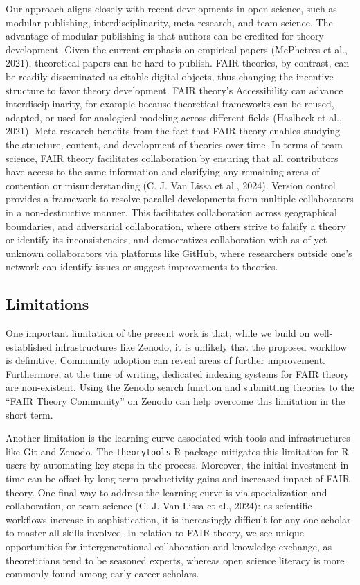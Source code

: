 \documentclass[man]{apa7}
\begin{document}
Our approach aligns closely with recent developments in open science,
such as modular publishing, interdisciplinarity, meta-research, and team science.
The advantage of modular publishing is that authors can be credited for theory development.
Given the current emphasis on empirical papers (McPhetres et al., 2021), theoretical papers can be hard to publish.
FAIR theories, by contrast, can be readily disseminated as citable digital objects, thus changing the incentive structure to favor theory development.
FAIR theory's Accessibility can advance interdisciplinarity,
for example because theoretical frameworks can be reused, adapted, or used for analogical modeling across different fields (Haslbeck et al., 2021).
Meta-research benefits from the fact that FAIR theory enables studying the structure, content, and development of theories over time.
In terms of team science, FAIR theory facilitates collaboration by ensuring that all contributors have access to the same information and
clarifying any remaining areas of contention or misunderstanding (C. J. Van Lissa et al., 2024).
Version control provides a framework to resolve parallel developments from multiple collaborators in a non-destructive manner.
This facilitates collaboration across geographical boundaries,
and adversarial collaboration, where others strive to falsify a theory or identify its inconsistencies, and democratizes collaboration with as-of-yet unknown collaborators via platforms like GitHub, where researchers outside one's network can identify issues or suggest improvements to theories.

\subsection{Limitations}\label{limitations}

One important limitation of the present work is that,
while we build on well-established infrastructures like Zenodo,
it is unlikely that the proposed workflow is definitive.
Community adoption can reveal areas of further improvement.
Furthermore, at the time of writing, dedicated indexing systems for FAIR theory are non-existent.
Using the Zenodo search function and submitting theories to the ``FAIR Theory Community'' on Zenodo can help overcome this limitation in the short term.

\label{learningcurve}{Another limitation is the learning curve associated with tools and infrastructures like Git and Zenodo.
The \texttt{theorytools} R-package mitigates this limitation for R-users by automating key steps in the process.
Moreover, the initial investment in time can be offset by long-term productivity gains and increased impact of FAIR theory.
One final way to address the learning curve is via specialization and collaboration, or team science (C. J. Van Lissa et al., 2024):
as scientific workflows increase in sophistication, it is increasingly difficult for any one scholar to master all skills involved.
In relation to FAIR theory, we see unique opportunities for intergenerational collaboration and knowledge exchange,
as theoreticians tend to be seasoned experts, whereas open science literacy is more commonly found among early career scholars.}
\end{document}
